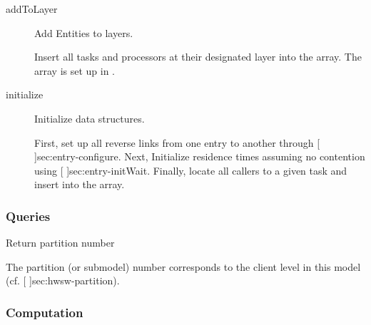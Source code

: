 \begin{description}
\label{sec:merged-addToLayer}
\item[addToLayer] \texonly{---} Add Entities to layers.\\

Insert all tasks and processors at their designated layer into the
 array.  The  array is set up in
. 

\label{sec:merged-initialize}
\item[initialize] \texonly{---} Initialize data structures. \\

First, set up all reverse links from one entry to another through
[ \Sec\Ref]{sec:entry-configure}.  Next,
Initialize residence times assuming no contention using
[ \Sec\Ref]{sec:entry-initWait}.  Finally,
locate all callers to a given task and insert into the 
array.

\end{description}

\subsubsection{Queries}

\begin{description}

\label{sec:merged-partition}
\item[partition] \texonly{---} Return partition number\\

The partition (or submodel) number corresponds to the client level in
this model (cf. [
  \Sec\Ref]{sec:hwsw-partition}).

\end{description}

\subsubsection{Computation}

